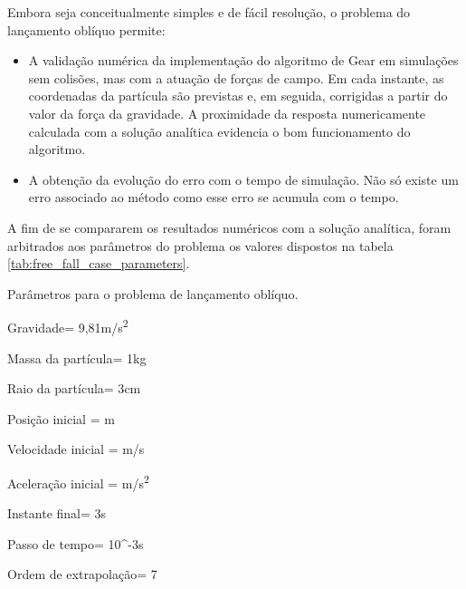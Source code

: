 Embora seja conceitualmente simples e de fácil resolução, o problema do lançamento oblíquo permite:
\begin{itemize}
\item A validação numérica da implementação do algoritmo de Gear em simulações sem colisões, mas com a atuação de forças de campo. Em cada instante, as coordenadas da partícula são previstas e, em seguida, corrigidas a partir do valor da força da gravidade. A proximidade da resposta numericamente calculada com a solução analítica evidencia o bom funcionamento do algoritmo.
\item A obtenção da evolução do erro com o tempo de simulação. Não só existe um erro associado ao método como esse erro se acumula com o tempo.
\end{itemize}

A fim de se compararem os resultados numéricos com a solução analítica, foram arbitrados aos parâmetros do problema os valores dispostos na tabela \ref{tab:free_fall_case_parameters}.

\begin{table}[h]
\centering
\caption{Parâmetros para o problema de lançamento oblíquo.}
\label{tab:free_fall_case_parameters}
\begin{parametersdesc}
	\item{Gravidade}{\gravityScalar = 9,81}{\si[per-mode=symbol]{\metre\per\square\second}}
	\hline
	\item{Massa da partícula}{\mass = 1}{\si\kilogram}
	\item{Raio da partícula}{\radius = 3}{\si\centi\metre}
	\item{Posição inicial}{\explicitVector{\initial{\positionx}}{\initial{\positiony}}{\initial{\positionz}} = }{\si{\metre}}
	\item{Velocidade inicial}{\explicitVector{\initial{\velocityx}}{\initial{\velocityy}}{\initial{\velocityz}} = }{\si[per-mode=symbol]{\metre\per\second}}
	\item{Aceleração inicial}{\explicitVector{\initial{\accelerationx}}{\initial{\accelerationy}}{\initial{\accelerationz}} = }{\si[per-mode=symbol]{\metre\per\square\second}}
	\hline
	\item{Instante final}{\finalInstant = 3}{\si\second} 
	\item{Passo de tempo}{\Dt = 10^{-3}}{\si\second}
	\item{Ordem de extrapolação}{\taylorOrder = 7}{\emptyUnit}
\end{parametersdesc}
\sourceMe 
\end{table}

